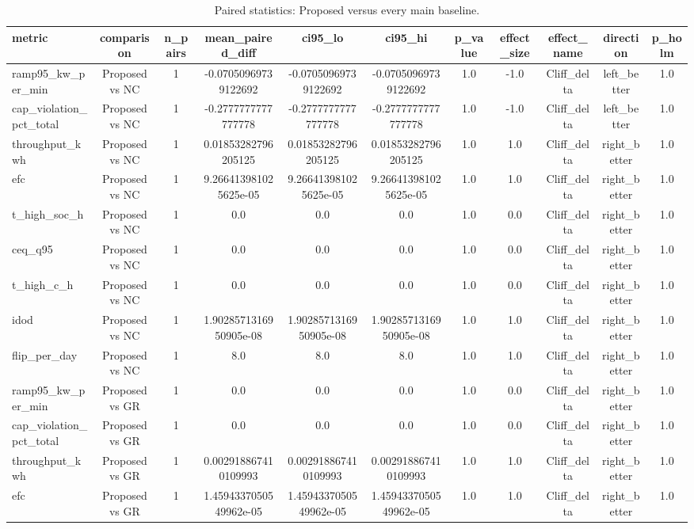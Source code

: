 \begin{table}[t]
\centering
\caption{Paired statistics: Proposed versus every main baseline.}
\label{tab:stats_all_auto}
\begin{tabular}{lcccccccccc}
\toprule
metric & comparison & n\_pairs & mean\_paired\_diff & ci95\_lo & ci95\_hi & p\_value & effect\_size & effect\_name & direction & p\_holm \\
\midrule
ramp95\_kw\_per\_min & Proposed vs NC & 1 & -0.07050969739122692 & -0.07050969739122692 & -0.07050969739122692 & 1.0 & -1.0 & Cliff\_delta & left\_better & 1.0 \\
cap\_violation\_pct\_total & Proposed vs NC & 1 & -0.2777777777777778 & -0.2777777777777778 & -0.2777777777777778 & 1.0 & -1.0 & Cliff\_delta & left\_better & 1.0 \\
throughput\_kwh & Proposed vs NC & 1 & 0.01853282796205125 & 0.01853282796205125 & 0.01853282796205125 & 1.0 & 1.0 & Cliff\_delta & right\_better & 1.0 \\
efc & Proposed vs NC & 1 & 9.266413981025625e-05 & 9.266413981025625e-05 & 9.266413981025625e-05 & 1.0 & 1.0 & Cliff\_delta & right\_better & 1.0 \\
t\_high\_soc\_h & Proposed vs NC & 1 & 0.0 & 0.0 & 0.0 & 1.0 & 0.0 & Cliff\_delta & right\_better & 1.0 \\
ceq\_q95 & Proposed vs NC & 1 & 0.0 & 0.0 & 0.0 & 1.0 & 0.0 & Cliff\_delta & right\_better & 1.0 \\
t\_high\_c\_h & Proposed vs NC & 1 & 0.0 & 0.0 & 0.0 & 1.0 & 0.0 & Cliff\_delta & right\_better & 1.0 \\
idod & Proposed vs NC & 1 & 1.9028571316950905e-08 & 1.9028571316950905e-08 & 1.9028571316950905e-08 & 1.0 & 1.0 & Cliff\_delta & right\_better & 1.0 \\
flip\_per\_day & Proposed vs NC & 1 & 8.0 & 8.0 & 8.0 & 1.0 & 1.0 & Cliff\_delta & right\_better & 1.0 \\
ramp95\_kw\_per\_min & Proposed vs GR & 1 & 0.0 & 0.0 & 0.0 & 1.0 & 0.0 & Cliff\_delta & right\_better & 1.0 \\
cap\_violation\_pct\_total & Proposed vs GR & 1 & 0.0 & 0.0 & 0.0 & 1.0 & 0.0 & Cliff\_delta & right\_better & 1.0 \\
throughput\_kwh & Proposed vs GR & 1 & 0.002918867410109993 & 0.002918867410109993 & 0.002918867410109993 & 1.0 & 1.0 & Cliff\_delta & right\_better & 1.0 \\
efc & Proposed vs GR & 1 & 1.4594337050549962e-05 & 1.4594337050549962e-05 & 1.4594337050549962e-05 & 1.0 & 1.0 & Cliff\_delta & right\_better & 1.0 \\

\end{tabular}
\end{table}
